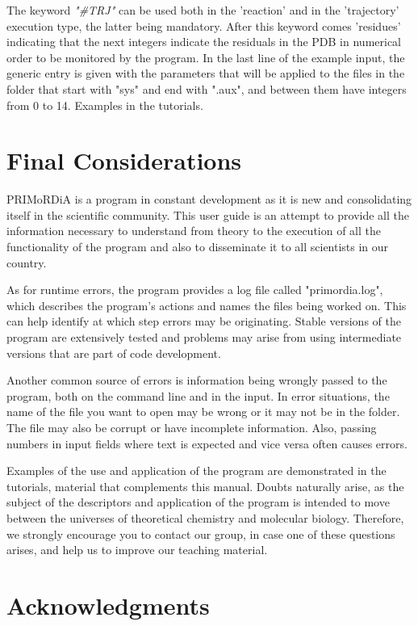 \documentclass[a4paper,11pt]{refart}
\begin{document}
The keyword \emph{"\#TRJ"} can be used both in the 'reaction' and in the 'trajectory' execution type, the latter being mandatory. After this keyword comes 'residues' indicating that the next integers indicate the residuals in the PDB in numerical order to be monitored by the program. In the last line of the example input, the generic entry is given with the parameters that will be applied to the files in the folder that start with "sys" and end with ".aux", and between them have integers from 0 to 14. Examples in the tutorials.

\section{Final Considerations}

PRIMoRDiA is a program in constant development as it is new and consolidating itself in the scientific community. This user guide is an attempt to provide all the information necessary to understand from theory to the execution of all the functionality of the program and also to disseminate it to all scientists in our country.

As for runtime errors, the program provides a log file called "primordia.log", which describes the program's actions and names the files being worked on. This can help identify at which step errors may be originating. Stable versions of the program are extensively tested and problems may arise from using intermediate versions that are part of code development.

Another common source of errors is information being wrongly passed to the program, both on the command line and in the input. In error situations, the name of the file you want to open may be wrong or it may not be in the folder. The file may also be corrupt or have incomplete information. Also, passing numbers in input fields where text is expected and vice versa often causes errors.

Examples of the use and application of the program are demonstrated in the tutorials, material that complements this manual. Doubts naturally arise, as the subject of the descriptors and application of the program is intended to move between the universes of theoretical chemistry and molecular biology. Therefore, we strongly encourage you to contact our group, in case one of these questions arises, and help us to improve our teaching material.

\section*{Acknowledgments}
\end{document}
